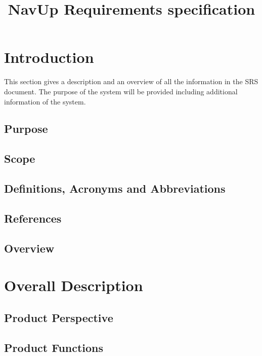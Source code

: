 \documentclass{article}
\begin{document}
\title{NavUp Requirements specification}
\maketitle

\clearpage
\tableofcontents

\clearpage
\section{Introduction}

This section gives a description and an overview of all the information in the SRS document. The purpose of the system will be provided including additional information of the system.

	\subsection{Purpose}
	
	
	\subsection{Scope}
	

	\subsection{Definitions, Acronyms and Abbreviations}
	
	
	\subsection{References}
	
	
	\subsection{Overview}
	

\clearpage
\section{Overall Description}
	\subsection{Product Perspective}
	

	\subsection{Product Functions}
	
	
\end{document}
